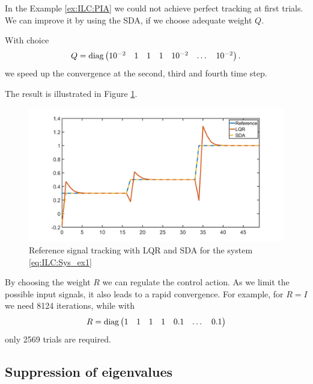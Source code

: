 \begin{exam}
	In the Example \ref{ex:ILC:PIA} we could not achieve perfect tracking at first trials. 
	We can improve it by using the SDA, if we choose adequate weight $Q$. 
	
	With choice 
	\begin{align}
	Q =  \operatorname*{diag} \begin{pmatrix}
		10^{-2} & 1 & 1 & 1 & 10^{-2} & \dots &10^{-2}
	\end{pmatrix}.
	\end{align}
	we speed up the convergence at the second, third and fourth time step. 
	
	The result is illustrated in Figure \ref{img:ILC:Ex1_SDA}. 

	\begin{figure}[ht]
		\centering
	\includegraphics[width=\textwidth]{fig/Ex1_SDA.jpg}
	\caption{Reference signal tracking with LQR and SDA for the system \eqref{eq:ILC:Sys_ex1}}
	\label{img:ILC:Ex1_SDA}
\end{figure}

By choosing the weight $R$ we can regulate the control action. As we limit the possible input signals, it also leads to a rapid convergence. For example, for $R = I$ we need 8124 iterations, while with 
\begin{align}
R = \operatorname*{diag} \begin{pmatrix}
1& 1 & 1 & 1 & 0.1 & \dots & 0.1
\end{pmatrix}
\end{align}
only 2569 trials are required. 

\end{exam}


\subsection{Suppression of eigenvalues} 

